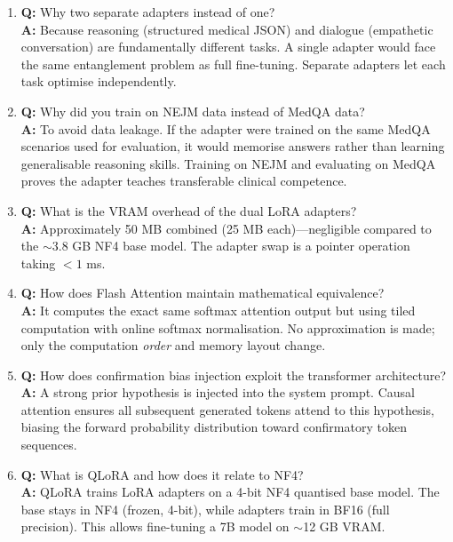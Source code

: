 \begin{vivabox}[\textcolor{white}{Likely Viva Questions}]
\begin{enumerate}
    \item \textbf{Q:} Why two separate adapters instead of one?\\
    \textbf{A:} Because reasoning (structured medical JSON) and dialogue (empathetic conversation) are fundamentally different tasks. A single adapter would face the same entanglement problem as full fine-tuning. Separate adapters let each task optimise independently.

    \item \textbf{Q:} Why did you train on NEJM data instead of MedQA data?\\
    \textbf{A:} To avoid data leakage. If the adapter were trained on the same MedQA scenarios used for evaluation, it would memorise answers rather than learning generalisable reasoning skills. Training on NEJM and evaluating on MedQA proves the adapter teaches transferable clinical competence.

    \item \textbf{Q:} What is the VRAM overhead of the dual LoRA adapters?\\
    \textbf{A:} Approximately 50 MB combined (25 MB each)---negligible compared to the $\sim$3.8 GB NF4 base model. The adapter swap is a pointer operation taking $< 1$ ms.

    \item \textbf{Q:} How does Flash Attention maintain mathematical equivalence?\\
    \textbf{A:} It computes the exact same softmax attention output but using tiled computation with online softmax normalisation. No approximation is made; only the computation \textit{order} and memory layout change.

    \item \textbf{Q:} How does confirmation bias injection exploit the transformer architecture?\\
    \textbf{A:} A strong prior hypothesis is injected into the system prompt. Causal attention ensures all subsequent generated tokens attend to this hypothesis, biasing the forward probability distribution toward confirmatory token sequences.

    \item \textbf{Q:} What is QLoRA and how does it relate to NF4?\\
    \textbf{A:} QLoRA trains LoRA adapters on a 4-bit NF4 quantised base model. The base stays in NF4 (frozen, 4-bit), while adapters train in BF16 (full precision). This allows fine-tuning a 7B model on $\sim$12 GB VRAM.
\end{enumerate}
\end{vivabox}

